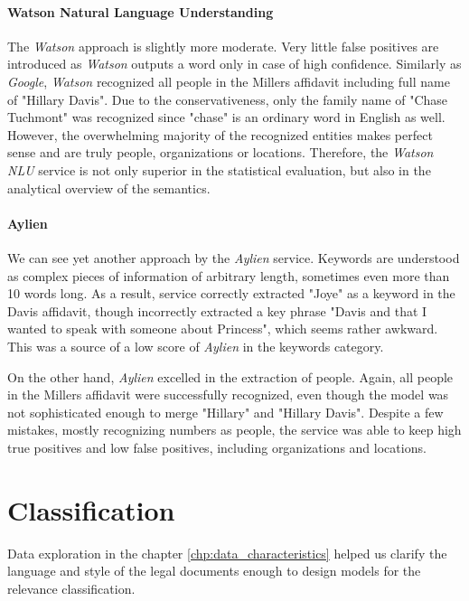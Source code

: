 \documentclass[
  digital, %
  notable,   %
  nolof,     %
  nolot,     %
  draft
]{fithesis3}
\begin{document}
\subsubsection{\textbf{Watson Natural Language Understanding}}
The \textit{Watson} approach is slightly more moderate.
Very little false positives are introduced as \textit{Watson} outputs a word only in case of high confidence.
Similarly as \textit{Google}, \textit{Watson} recognized all people in the Millers affidavit including full name of "Hillary Davis".
Due to the conservativeness, only the family name of "Chase Tuchmont" was recognized since "chase" is an ordinary word in English as well.
However, the overwhelming majority of the recognized entities makes perfect sense and are truly people, organizations or locations.
Therefore, the \textit{Watson NLU} service is not only superior in the statistical evaluation, but also in the analytical overview of the semantics.

\subsubsection{\textbf{Aylien}}
We can see yet another approach by the \textit{Aylien} service.
Keywords are understood as complex pieces of information of arbitrary length, sometimes even more than 10 words long.
As a result, service correctly extracted "Joye" as a keyword in the Davis affidavit, though incorrectly extracted a key phrase "Davis and that I wanted to speak with someone about Princess", which seems rather awkward.
This was a source of a low score of \textit{Aylien} in the keywords category.

On the other hand, \textit{Aylien} excelled in the extraction of people.
Again, all people in the Millers affidavit were successfully recognized, even though the model was not sophisticated enough to merge "Hillary" and "Hillary Davis".
Despite a few mistakes, mostly recognizing numbers as people, the service was able to keep high true positives and low false positives, including organizations and locations.


\chapter{Classification}
Data exploration in the chapter \ref{chp:data_characteristics} helped us clarify the language and style of the legal documents enough to design models for the relevance classification.
\end{document}
